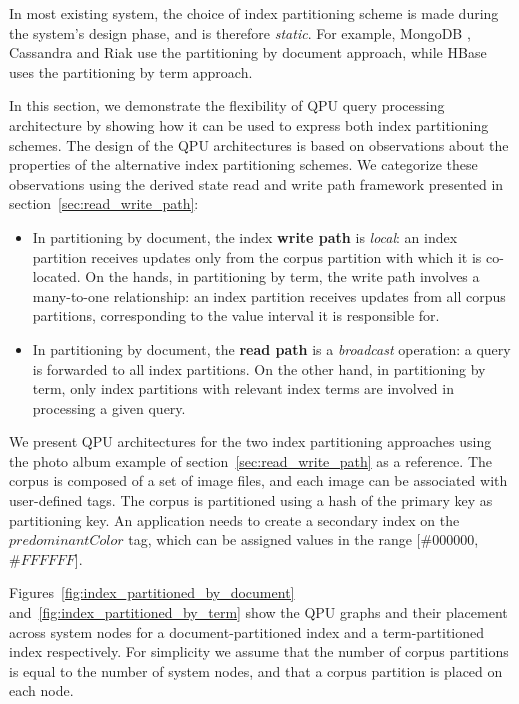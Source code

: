 In most existing system, the choice of index partitioning scheme is made during the system's design phase, and is therefore \textit{static}.
For example, MongoDB \cite{coubase:mongoindexes}, Cassandra \cite{cassandra:secondaryindexing} and Riak \cite{riakv:secondaryindexes}
use the partitioning by document approach,
while HBase \cite{hbase:secondaryindexes} uses the partitioning by term approach.

\bigskip
\noindent
In this section, we demonstrate the flexibility of QPU query processing architecture by showing how it can be used to
express both index partitioning schemes.
The design of the QPU architectures is based on observations about the properties of the alternative
index partitioning schemes.
We categorize these observations using the derived state read and write path framework presented in
section~\ref{sec:read_write_path}:
\begin{itemize}
  \item In partitioning by document, the index \textbf{write path} is \textit{local}:
  an index partition receives updates only from the corpus partition with which it is co-located.
  On the hands, in partitioning by term, the write path involves a many-to-one relationship:
  an index partition receives updates from all corpus partitions, corresponding to the value interval it is responsible for.

  \item In partitioning by document, the \textbf{read path} is a \textit{broadcast} operation:
  a query is forwarded to all index partitions.
  On the other hand, in partitioning by term, only index partitions with relevant index terms are involved in processing a given query.
\end{itemize}

We present QPU architectures for the two index partitioning approaches using the photo album example of section~\ref{sec:read_write_path} as a reference.
The corpus is composed of a set of image files, and each image can be associated with user-defined tags.
The corpus is partitioned using a hash of the primary key as partitioning key.
An application needs to create a secondary index on the $predominantColor$ tag, which can be assigned values in the range $[\#000000$, $\#FFFFFF$].

Figures~\ref{fig:index_partitioned_by_document} and~\ref{fig:index_partitioned_by_term} show the QPU graphs and their
placement across system nodes for a document-partitioned index and a term-partitioned index respectively.
For simplicity we assume that the number of corpus partitions is equal to the number of system nodes,
and that a corpus partition is placed on each node.

